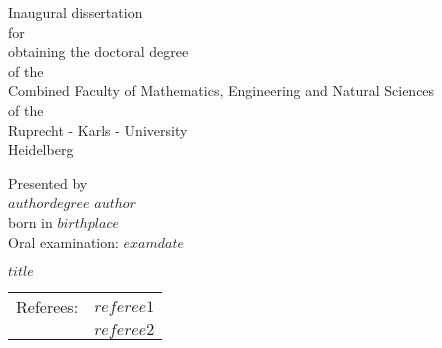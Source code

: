 \documentclass[11pt, a4paper, twosided]{book}
\begin{document}

\thispagestyle{empty}
 \begin{center}
 {\Large{Inaugural dissertation\\
   for\\
   obtaining the doctoral degree\\
   of the\\
   Combined Faculty of Mathematics, Engineering and Natural Sciences\\
   of the\\
   Ruprecht - Karls - University\\
   Heidelberg\\}} \vspace*{\fill}

 \Large{Presented by} \\\vspace{0.5cm}
 \Large{$authordegree$ $author$} \\
 \Large{born in $birthplace$} \\
 \Large{Oral examination: $examdate$}

\end{center}
\newpage\null\thispagestyle{empty}\newpage


\pagebreak
\thispagestyle{empty}
\null
\begin{center}
\Large{$title$} \\
\vspace*{\fill}
\begin{tabular}{ c c }
Referees: & $referee1$ \\
          & $referee2$
\end{tabular}
\end{center}
\newpage\null\thispagestyle{empty}\newpage

\end{document}
